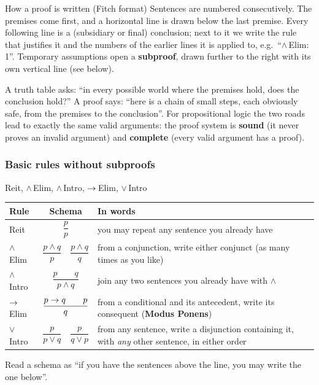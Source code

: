 \begin{nbfact}{How a proof is written (Fitch format)}
Sentences are numbered consecutively. The premises come first, and a horizontal line is
drawn below the last premise. Every following line is a (subsidiary or final) conclusion;
next to it we write the rule that justifies it and the numbers of the earlier lines it is
applied to, e.g.\ ``$\land$\,Elim: 1''. Temporary assumptions open a \textbf{subproof},
drawn further to the right with its own vertical line (see below).
\end{nbfact}

\begin{nbintuition}
A truth table asks: ``in every possible world where the premises hold, does the
conclusion hold?'' A proof says: ``here is a chain of small steps, each obviously safe,
from the premises to the conclusion''. For propositional logic the two roads lead to
exactly the same valid arguments: the proof system is \textbf{sound} (it never proves an
invalid argument) and \textbf{complete} (every valid argument has a proof).
\end{nbintuition}

\subsubsection{Basic rules without subproofs}

\begin{nbfact}{Reit, $\land$\,Elim, $\land$\,Intro, $\rightarrow$\,Elim, $\lor$\,Intro}
\begin{center}
\renewcommand{\arraystretch}{2.6}
\begin{tabularx}{\linewidth}{@{}l c X@{}}
\toprule
\textbf{Rule} & \textbf{Schema} & \textbf{In words} \\
\midrule
Reit & $\dfrac{p}{p}$ & you may repeat any sentence you already have \\
$\land$\,Elim & $\dfrac{p \land q}{p} \quad \dfrac{p \land q}{q}$ & from a conjunction, write either conjunct (as many times as you like) \\
$\land$\,Intro & $\dfrac{p \qquad q}{p \land q}$ & join any two sentences you already have with $\land$ \\
$\rightarrow$\,Elim & $\dfrac{p \rightarrow q \qquad p}{q}$ & from a conditional and its antecedent, write its consequent (\textbf{Modus Ponens}) \\
$\lor$\,Intro & $\dfrac{p}{p \lor q} \quad \dfrac{p}{q \lor p}$ & from any sentence, write a disjunction containing it, with \emph{any} other sentence, in either order \\
\bottomrule
\end{tabularx}
\end{center}
Read a schema as ``if you have the sentences above the line, you may write the one below''.
\end{nbfact}

